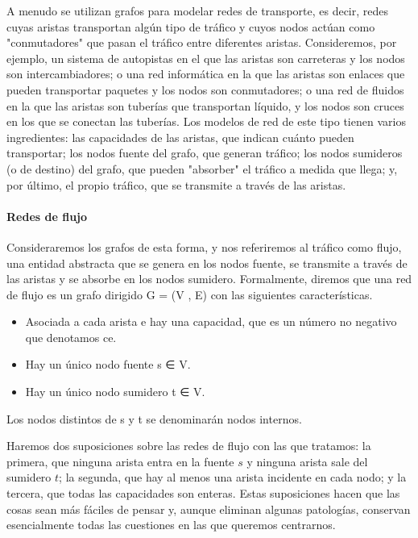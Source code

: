 \documentclass[a4paper, 12pt]{book}
\begin{document}
A menudo se utilizan grafos para modelar redes de transporte, es decir, redes cuyas aristas transportan algún tipo de tráfico y cuyos nodos actúan como "conmutadores" que pasan el tráfico entre diferentes aristas. Consideremos, por ejemplo, un sistema de autopistas en el que las aristas son carreteras y los nodos son intercambiadores; o una red informática en la que las aristas son enlaces que pueden transportar paquetes y los nodos son conmutadores; o una red de fluidos en la que las aristas son tuberías que transportan líquido, y los nodos son cruces en los que se conectan las tuberías. Los modelos de red de este tipo tienen varios ingredientes: las capacidades de las aristas, que indican cuánto pueden transportar; los nodos fuente del grafo, que generan tráfico; los nodos sumideros (o de destino) del grafo, que pueden "absorber" el tráfico a medida que llega; y, por último, el propio tráfico, que se transmite a través de las aristas.

\paragraph{Redes de flujo} Consideraremos los grafos de esta forma, y nos referiremos al tráfico como flujo, una entidad abstracta que se genera en los nodos fuente, se transmite a través de las aristas y se absorbe en los nodos sumidero. Formalmente, diremos que una red de flujo es un grafo dirigido G = (V , E) con las siguientes características.

\begin{itemize}
    \item Asociada a cada arista e hay una capacidad, que es un número no negativo que denotamos ce.
    \item Hay un único nodo fuente s ∈ V.
    \item Hay un único nodo sumidero t ∈ V.
\end{itemize}

Los nodos distintos de s y t se denominarán nodos internos.

Haremos dos suposiciones sobre las redes de flujo con las que tratamos: la primera, que ninguna arista entra en la fuente $s$ y ninguna arista sale del sumidero $t$; la segunda, que hay al menos una arista incidente en cada nodo; y la tercera, que todas las capacidades son enteras. Estas suposiciones hacen que las cosas sean más fáciles de pensar y, aunque eliminan algunas patologías, conservan esencialmente todas las cuestiones en las que queremos centrarnos.
\end{document}
